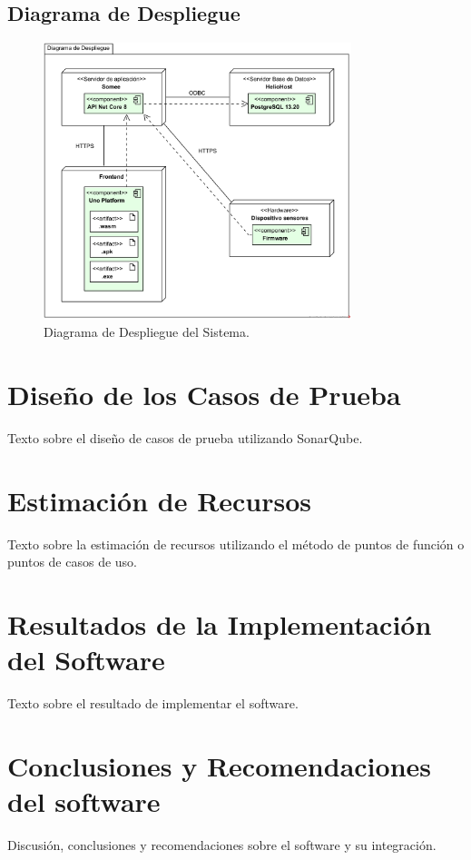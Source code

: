 
\subsection{Diagrama de Despliegue}
\begin{figure}[H]
    \centering
    \caption{Diagrama de Despliegue del Sistema.}
    \label{fig:despliegue}
    \includegraphics[width=0.8\textwidth]{UML/Otros/Diagrama de Despliegue.png}
\end{figure}


\section{Diseño de los Casos de Prueba}
Texto sobre el diseño de casos de prueba utilizando SonarQube.


\section{Estimación de Recursos}
Texto sobre la estimación de recursos utilizando el método de puntos de función o puntos de casos de uso.

\section{Resultados de la Implementación del Software}
Texto sobre el resultado de implementar el software.

\section{Conclusiones y Recomendaciones del software}
Discusión, conclusiones y recomendaciones sobre el software y su integración.
